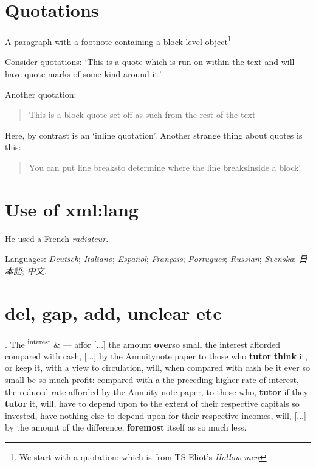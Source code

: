 \documentclass[11pt,twoside]{article}\makeatletter
\makeatletter
\def\gap{}
\renewcommand\section{\@startsection {section}{1}{\z@}%
     {-1.75ex \@plus -0.5ex \@minus -.2ex}%
     {0.5ex \@plus .2ex}%
     {\reset@font\Large\bfseries\sffamily}}
\def\DivI{\section}
\def\DivI{\chapter}
\makeatother
\begin{document}
\DivI[Quotations]{Quotations}\par
A paragraph with a footnote containing a block-level object\footnote{We start with a quotation:
 which is from TS Eliot's \textit{Hollow men}}\par
Consider quotations: ‘This is a quote which is run on within the text and will have quote marks of some kind around it.’\par
Another quotation: \begin{quote}This is a block quote set off as such from the rest of the text\end{quote}\par
Here, by contrast is an ‘inline quotation’. Another strange thing about quotes is this: \begin{quote}You can put line breaks{\hskip1pt}\newline to determine where the line breaks{\hskip1pt}\newline Inside a block!\end{quote}
\DivI[Use of xml:lang]{Use of xml:lang}\par
He used a French \textit{radiateur}.\par
Languages: \textit{Deutsch}; \textit{Italiano}; \textit{Español}; \textit{Français}; \textit{Portugues}; \textit{Russian}; \textit{Svenska}; \textit{日本語}; \textit{中文}.
\DivI[del, gap, add, unclear etc]{del, gap, add, unclear etc}\par
[...]\gap{}. The \textsuperscript{interest} & — affor [...]\gap{} the amount \textbf{over}{\hskip1pt}\newline  so small the interest afforded compared with cash, [...]\gap{} by the Annuity{\hskip1pt}\newline  note paper to those who \textbf{tutor} \textbf{think} it, or keep it, with a view {\hskip1pt}\newline  to circulation, will, when compared with cash be it ever so small be {\hskip1pt}\newline  so much \uline{profit}: compared with a the preceding higher {\hskip1pt}\newline  rate of interest, the reduced rate afforded by the Annuity {\hskip1pt}\newline  note paper, to those who, \textbf{tutor} if they \textbf{tutor} it, {\hskip1pt}\newline  will, have to depend upon to the extent of their {\hskip1pt}\newline  respective capitals so invested, have nothing else {\hskip1pt}\newline  to depend upon for their respective incomes, will, [...]\gap{} by the {\hskip1pt}\newline  amount of the difference, \textbf{foremost} itself as so {\hskip1pt}\newline  much less.
\end{document}
